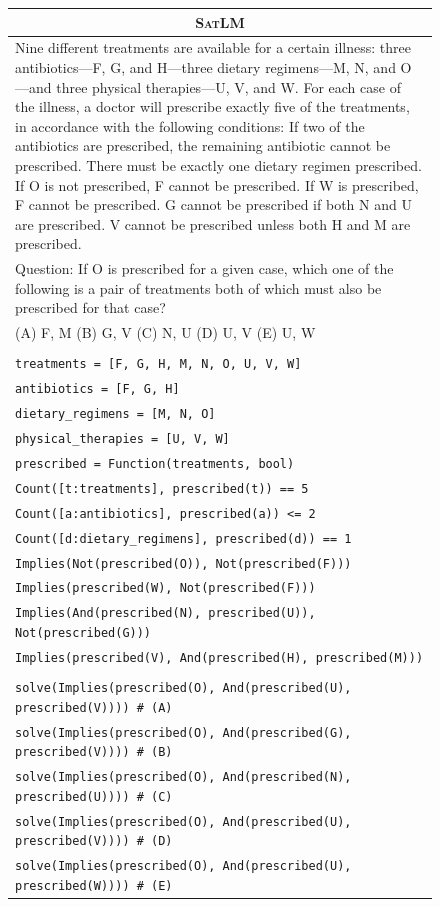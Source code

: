\documentclass{article}
\theoremstyle{definition}
\newcommand{\satlm}{\textsc{SatLM}}
\begin{document}
\begin{figure}[h]
    \footnotesize
    \centering
    \begin{tabularx}{\linewidth}{X}
    \toprule
            \multicolumn{1}{c}{\textbf{\satlm{}} } \\
         \midrule
Nine different treatments are available for a certain illness: three antibiotics—F, G, and H—three dietary regimens—M, N, and O—and three physical therapies—U, V, and W. For each case of the illness, a doctor will prescribe exactly five of the treatments, in accordance with the following conditions: If two of the antibiotics are prescribed, the remaining antibiotic cannot be prescribed. There must be exactly one dietary regimen prescribed. If O is not prescribed, F cannot be prescribed. If W is prescribed, F cannot be prescribed. G cannot be prescribed if both N and U are prescribed. V cannot be prescribed unless both H and M are prescribed. \\
Question: If O is prescribed for a given case, which one of the following is a pair of treatments both of which must also be prescribed for that case?\\
(A) F, M (B) G, V (C) N, U (D) U, V (E) U, W \\
\\

\tt treatments = [F, G, H, M, N, O, U, V, W] \\
\tt antibiotics = [F, G, H] \\
\tt dietary\_regimens = [M, N, O] \\
\tt physical\_therapies = [U, V, W] \\
\tt prescribed = Function(treatments, bool) \\

\tt Count([t:treatments], prescribed(t)) == 5 \\
\tt Count([a:antibiotics], prescribed(a)) <= 2 \\
\tt Count([d:dietary\_regimens], prescribed(d)) == 1 \\
\tt Implies(Not(prescribed(O)), Not(prescribed(F))) \\
\tt Implies(prescribed(W), Not(prescribed(F))) \\
\tt Implies(And(prescribed(N), prescribed(U)), Not(prescribed(G))) \\
\tt Implies(prescribed(V), And(prescribed(H), prescribed(M))) \\
\\
\tt solve(Implies(prescribed(O), And(prescribed(U), prescribed(V)))) \# (A) \\
\tt solve(Implies(prescribed(O), And(prescribed(G), prescribed(V)))) \# (B) \\
\tt solve(Implies(prescribed(O), And(prescribed(N), prescribed(U)))) \# (C) \\
\tt solve(Implies(prescribed(O), And(prescribed(U), prescribed(V)))) \# (D) \\
\tt solve(Implies(prescribed(O), And(prescribed(U), prescribed(W)))) \# (E)\\


\end{tabularx}
\end{figure}
\end{document}
